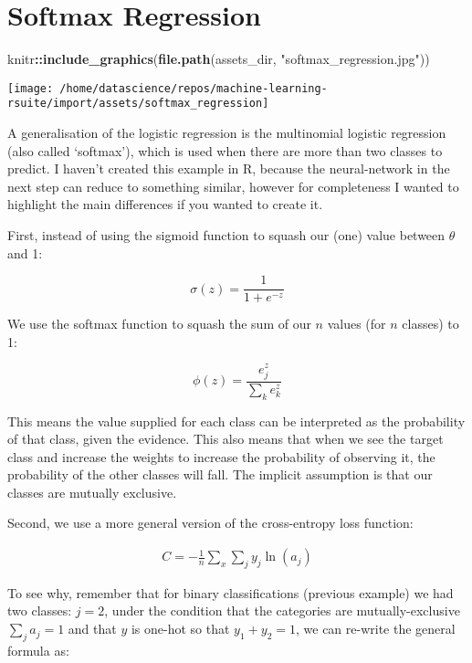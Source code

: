 \documentclass[]{book}
\newenvironment{Shaded}{\begin{snugshade}}{\end{snugshade}}
\newcommand{\KeywordTok}[1]{\textcolor[rgb]{0.13,0.29,0.53}{\textbf{#1}}}
\newcommand{\NormalTok}[1]{#1}
\newcommand{\OperatorTok}[1]{\textcolor[rgb]{0.81,0.36,0.00}{\textbf{#1}}}
\newcommand{\StringTok}[1]{\textcolor[rgb]{0.31,0.60,0.02}{#1}}
\begin{document}
\hypertarget{softmax-regression}{%
\section{Softmax Regression}\label{softmax-regression}}

\begin{Shaded}
\begin{Highlighting}[]
\NormalTok{knitr}\OperatorTok{::}\KeywordTok{include_graphics}\NormalTok{(}\KeywordTok{file.path}\NormalTok{(assets_dir, }\StringTok{"softmax_regression.jpg"}\NormalTok{))}
\end{Highlighting}
\end{Shaded}

\begin{center}\texttt{[image: /home/datascience/repos/machine-learning-rsuite/import/assets/softmax\_regression]} \end{center}

A generalisation of the logistic regression is the multinomial logistic regression (also called `softmax'), which is used when there are more than two classes to predict. I haven't created this example in R, because the neural-network in the next step can reduce to something similar, however for completeness I wanted to highlight the main differences if you wanted to create it.

First, instead of using the sigmoid function to squash our (one) value between \(\theta\) and 1:

\[\sigma(z) = \frac {1}{1+e^{-z}}\]

We use the softmax function to squash the sum of our \(n\) values (for \(n\) classes) to 1:

\[\phi(z) = \frac {e^z_j}{\sum_k e^z_k}\]

This means the value supplied for each class can be interpreted as the probability of that class, given the evidence. This also means that when we see the target class and increase the weights to increase the probability of observing it, the probability of the other classes will fall. The implicit assumption is that our classes are mutually exclusive.

Second, we use a more general version of the cross-entropy loss function:

\[\begin{aligned} 
   C = -\frac{1}{n}\sum_x\sum_j y_j\ln(a_j)
\end{aligned}\]

To see why, remember that for binary classifications (previous example) we had two classes:
\(j=2\), under the condition that the categories are mutually-exclusive \(\sum_ja_j = 1\) and that \(y\) is one-hot so that \(y_1+y_2=1\), we can re-write the general formula as:
\end{document}
